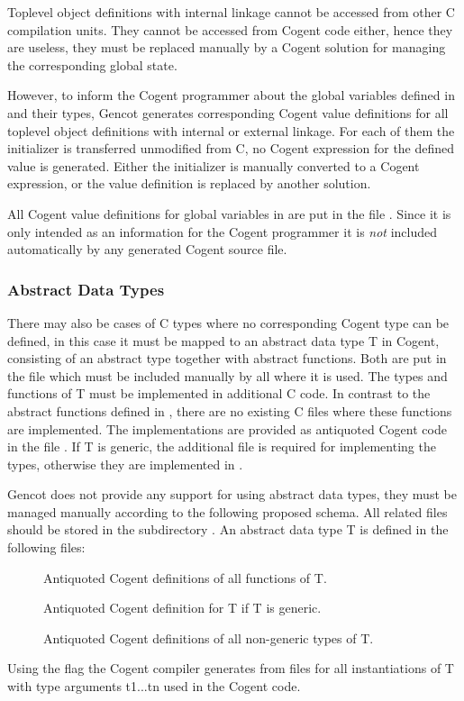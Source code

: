 Toplevel object definitions with internal linkage cannot be accessed from other C compilation units. They cannot be
accessed from Cogent code either, hence they are useless, they must be replaced manually by a Cogent solution for
managing the corresponding global state. 

However, to inform the Cogent programmer about the global variables defined in  and their types, Gencot 
generates corresponding Cogent value definitions for all toplevel object definitions with internal or external linkage. 
For each of them the initializer is transferred unmodified from C, no Cogent expression for the defined value is 
generated. Either the initializer is manually converted to a Cogent expression, or the value definition is replaced
by another solution. 

All Cogent value definitions for global variables in  are put in the file . Since it
is only intended as an information for the Cogent programmer it is \textit{not} included automatically by any generated
Cogent source file.

\subsubsection{Abstract Data Types}

There may also be cases of C types where no corresponding Cogent type can be defined, in this case it must be mapped to an 
abstract data type T in Cogent, consisting of an abstract type together with abstract functions. Both are put in 
the file  which must be included manually by all  where it is used. The types and 
functions of T must be implemented in additional C code. In contrast to the abstract functions defined in ,
there are no existing C files where these functions are implemented. The implementations are provided as antiquoted Cogent 
code in the file . If T is generic, the additional file  is required for 
implementing the types, otherwise they are implemented in . 

Gencot does not provide any support for using abstract data types, they must be managed manually according to the following
proposed schema. All related files should be stored in the subdirectory .
An abstract data type T is defined in the following files:
\begin{description}
\item[] Antiquoted Cogent definitions of all functions of T. 
\item[] Antiquoted Cogent definition for T if T is generic.
\item[] Antiquoted Cogent definitions of all non-generic types of T.
\end{description}
Using the flag  the Cogent compiler generates from  files  for all 
instantiations of T with type arguments t1...tn used in the Cogent code.

